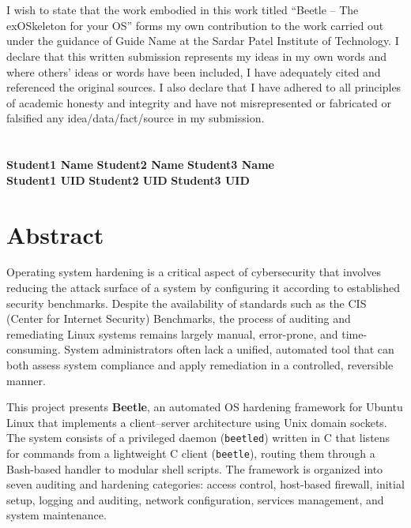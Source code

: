 \documentclass[12pt,oneside,a4paper]{article}
\begin{document}
\section*{}

\vspace{3.5cm}
I wish to state that the work embodied in this work titled ``Beetle -- The exOSkeleton for your OS'' forms my own contribution to the work carried out under the guidance of Guide Name at the Sardar Patel Institute of Technology. I declare that this written submission represents my ideas in my own words and where others' ideas or words have been included, I have adequately cited and referenced the original sources. I also declare that I have adhered to all principles of academic honesty and integrity and have not misrepresented or fabricated or falsified any idea/data/fact/source in my submission.
\\
\\
\\
\textbf{Student1 Name} \hspace{2cm} \textbf{Student2 Name} \hspace{2cm} \textbf{Student3 Name}\\
\vspace{4cm}
\textbf{Student1 UID} \hspace{3cm} \textbf{Student2 UID} \hspace{2cm} \textbf{Student3 UID}\\
\vspace{1cm}

\pagebreak
\section*{Abstract}

Operating system hardening is a critical aspect of cybersecurity that involves reducing the attack surface of a system by configuring it according to established security benchmarks. Despite the availability of standards such as the CIS (Center for Internet Security) Benchmarks, the process of auditing and remediating Linux systems remains largely manual, error-prone, and time-consuming. System administrators often lack a unified, automated tool that can both assess system compliance and apply remediation in a controlled, reversible manner.

This project presents \textbf{Beetle}, an automated OS hardening framework for Ubuntu Linux that implements a client--server architecture using Unix domain sockets. The system consists of a privileged daemon (\texttt{beetled}) written in C that listens for commands from a lightweight C client (\texttt{beetle}), routing them through a Bash-based handler to modular shell scripts. The framework is organized into seven auditing and hardening categories: access control, host-based firewall, initial setup, logging and auditing, network configuration, services management, and system maintenance.
\end{document}
